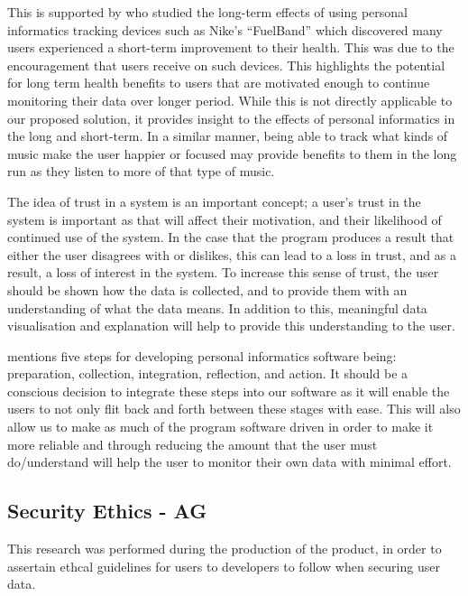 \documentclass[10pt, notitlepage]{report}
\begin{document}
This is supported by \cite{Fritz2014} who studied the long-term effects of using personal informatics tracking devices such as Nike’s “FuelBand” which discovered many users experienced a short-term improvement to their health. This was due to the encouragement that users receive on such devices. This highlights the potential for long term health benefits to users that are motivated enough to continue monitoring their data over longer period. While this is not directly applicable to our proposed solution, it provides insight to the effects of personal informatics in the long and short-term. In a similar manner, being able to track what kinds of music make the user happier or focused may provide benefits to them in the long run as they listen to more of that type of music.

The idea of trust in a system is an important concept; a user’s trust in the system is important as that will affect their motivation, and their likelihood of continued use of the system. In the case that the program produces a result that either the user disagrees with or dislikes, this can lead to a loss in trust, and as a result, a loss of interest in the system. To increase this sense of trust, the user should be shown how the data is collected, and to provide them with an understanding of what the data means. In addition to this, meaningful data visualisation and explanation will help to provide this understanding to the user. \cite{Jaimes2013}

\cite{Li2010} mentions five steps for developing personal informatics software being: preparation, collection, integration, reflection, and action.  It should be a conscious decision to integrate these steps into our software as it will enable the users to not only flit back and forth between these stages with ease. This will also allow us to make as much of the program software driven in order to make it more reliable and through reducing the amount that the user must do/understand will help the user to monitor their own data with minimal effort.

\subsection{Security Ethics - AG}
\label{res:secethics}

This research was performed during the production of the product, in order to assertain ethcal guidelines for users to developers to follow when securing user data.\newline
\end{document}
